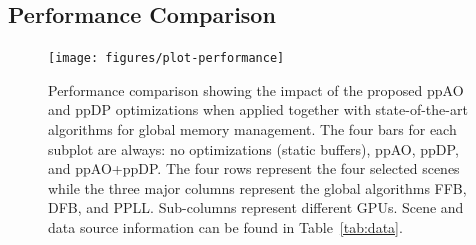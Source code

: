 \documentclass{egpubl}
\newcommand{\stencil}{ppAO}
\newcommand{\dloop}{ppDP}
\begin{document}
\subsection{Performance Comparison}
\label{sec:perf-comp}


\begin{figure}[t]
  \centering
    \texttt{[image: figures/plot-performance]} %
    \caption{\label{fig:performance}%
      Performance comparison showing the impact of the proposed \stencil{} and \dloop{} optimizations when applied together with state-of-the-art algorithms for global memory management. 
      The four bars for each subplot are always: no optimizations (static buffers), \stencil{}, \dloop{}, and \stencil{}+\dloop{}. 
      The four rows represent the four selected scenes while the three major columns represent the global algorithms FFB, DFB, and PPLL. 
      Sub-columns represent different GPUs. 
      Scene and data source information can be found in Table~\ref{tab:data}. 
    }
\end{figure}
\end{document}
